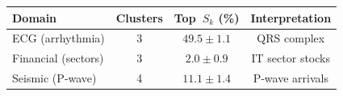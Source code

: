 \begin{tabular}{l c c c}
\toprule
\textbf{Domain} & \textbf{Clusters} & \textbf{Top~$S_k$ (\%)} & \textbf{Interpretation} \\
\midrule
ECG (arrhythmia)      & 3  & $49.5 \pm 1.1$ & QRS complex \\
Financial (sectors)   & 3 & $2.0 \pm 0.9$ & IT sector stocks \\
Seismic (P‑wave)      & 4  & $11.1 \pm 1.4$ & P‑wave arrivals \\
\bottomrule
\end{tabular}
